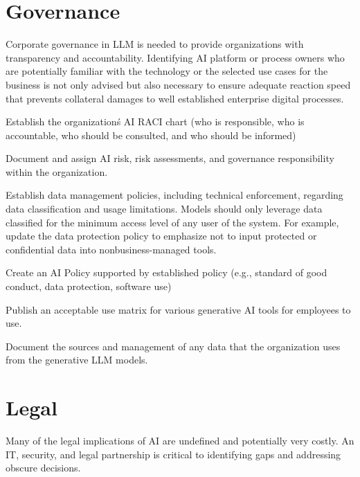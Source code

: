 \clearpage

\section{Governance}
Corporate governance in LLM is needed to provide organizations with transparency and accountability. Identifying AI platform or process owners who are potentially familiar with the technology or the selected use cases for the business is not only advised but also necessary to ensure adequate reaction speed that prevents collateral damages to well established enterprise digital processes.

\begin{minipage}{\linewidth}
\begin{checklist}
  \item Establish the organization\'s AI RACI chart (who is responsible, who is accountable, who should be consulted, and who should be informed)
  \item Document and assign AI risk, risk assessments, and governance responsibility within the organization.
  \item Establish data management policies, including technical enforcement, regarding data classification and usage limitations. Models should only leverage data classified for the minimum access level of any user of the system. For example, update the data protection policy to emphasize not to input protected or confidential data into nonbusiness-managed tools.
  \item Create an AI Policy supported by established policy (e.g., standard of good conduct, data protection, software use)
  \item Publish an acceptable use matrix for various generative AI tools for employees to use.
  \item Document the sources and management of any data that the organization uses from the generative LLM models.
\end{checklist}
\end{minipage}

\clearpage

\section{Legal}
Many of the legal implications of AI are undefined and potentially very costly. An IT, security, and legal partnership is critical to identifying gaps and addressing obscure decisions.

